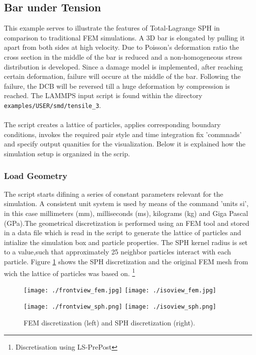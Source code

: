 \documentclass[11pt]{scrartcl}
\begin{document}
\subsection{Bar under Tension}
\label{sec:3d-bar}

This example serves to illustrate the features of Total-Lagrange SPH in comparison to traditional FEM
simulations. A 3D bar is elongated by pulling it apart from both sides at high velocity. Due to
Poisson's deformation ratio the cross section in the middle of the bar is reduced and a non-homogeneous
stress distribution is developed. Since a damage model is implemented, after reaching certain
deformation, failure will occure at the middle of the bar. Following the failure, the DCB will be
reversed till a huge deformation by compression is reached. The LAMMPS input script is found within
the directory \texttt{examples/USER/smd/tensile\_3}.
\\\\
The script creates a lattice of particles, applies corresponding boundary conditions, invokes the
required pair style and time integration fix 'commnads' and specify output quanities for the
visualization. Below it is explained how the simulation setup is organized in the scrip.

\subsubsection{Load Geometry}
The script starts difining a series of constant parameters relevant for the simulation. A consistent
unit system is used by means of the command 'units si', in this case millimeters (mm), milliseconds
(ms), kilograms (kg) and Giga Pascal (GPa).The geometrical discretization is performed using an FEM
tool and stored in a data file which is read in the script to generate the lattice of particles and
intialize the simulation box and particle properties. The SPH kernel radius is set to a value,such that
approximately 25 neighbor particles interact with each particle. Figure \ref{fig:fem-sph} shows the
SPH discretization and the original FEM mesh from wich the lattice of particles was based on.
\footnote{Discretisation using LS-PrePost}
\\
\begin{figure}[htbp]
  \begin{minipage}{0.495\textwidth}
    \centering
      \texttt{[image: ./frontview\_fem.jpg]}
      \texttt{[image: ./isoview\_fem.jpg]}
  \end{minipage}\hfill
  \begin{minipage}{0.495\textwidth}
    \centering
      \texttt{[image: ./frontview\_sph.png]}
      \texttt{[image: ./isoview\_sph.png]}
  \end{minipage}
  \caption{FEM discretization (left) and SPH discretization (right).}
  \label{fig:fem-sph}
\end{figure}
\end{document}
